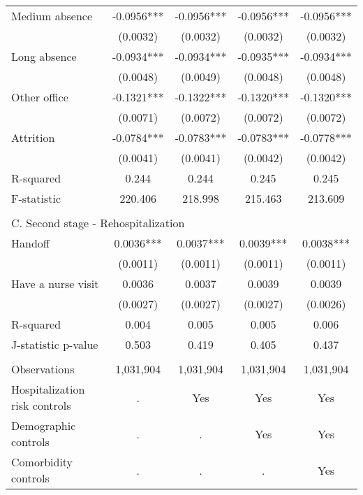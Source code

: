 \documentclass[final,12pt, notitlepage]{article}
\begin{document}
\begin{singlespace}
\begin{table}[H]
\begin{threeparttable}
{\begin{tabular*}{\textwidth}{l@{\extracolsep{\fill}}*{4}{c}}
Medium absence      &     -0.0956***&     -0.0956***&     -0.0956***&     -0.0956***\\
                    &    (0.0032)   &    (0.0032)   &    (0.0032)   &    (0.0032)   \\
Long absence        &     -0.0934***&     -0.0934***&     -0.0935***&     -0.0934***\\
                    &    (0.0048)   &    (0.0049)   &    (0.0048)   &    (0.0048)   \\
Other office        &     -0.1321***&     -0.1322***&     -0.1320***&     -0.1320***\\
                    &    (0.0071)   &    (0.0072)   &    (0.0072)   &    (0.0072)   \\
Attrition           &     -0.0784***&     -0.0783***&     -0.0783***&     -0.0778***\\
                    &    (0.0041)   &    (0.0041)   &    (0.0042)   &    (0.0042)   \\
R-squared           &       0.244   &       0.244   &       0.245   &       0.245   \\
F-statistic         &     220.406   &     218.998   &     215.463   &     213.609   \\
\\
\multicolumn{5}{l}{C. Second stage - Rehospitalization} \\
Handoff             &      0.0036***&      0.0037***&      0.0039***&      0.0038***\\
                    &    (0.0011)   &    (0.0011)   &    (0.0011)   &    (0.0011)   \\
Have a nurse visit  &      0.0036   &      0.0037   &      0.0039   &      0.0039   \\
                    &    (0.0027)   &    (0.0027)   &    (0.0027)   &    (0.0026)   \\
R-squared           &       0.004   &       0.005   &       0.005   &       0.006   \\
J-statistic p-value &       0.503   &       0.419   &       0.405   &       0.437   \\
\\
\midrule
Observations        &     1,031,904         &     1,031,904         &     1,031,904         &     1,031,904         \\
Hospitalization risk controls & . & Yes & Yes & Yes \\
Demographic controls & . & . & Yes & Yes \\
 Comorbidity controls & . & . & . & Yes \\

\end{tabular*}}
\end{threeparttable}
\end{table}
\end{singlespace}
\end{document}
